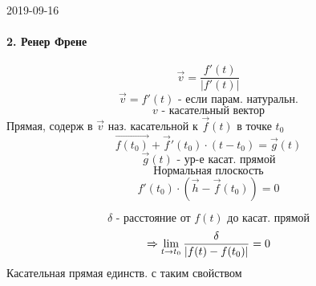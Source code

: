 \documentclass[12pt, fleqn]{article}
\begin{document}
\begin{lect} {2019-09-16}
\paragraph{2. Ренер Френе}
	\begin{Definition}
		\[\vec{v} = \frac{f'(t)}{|f'(t)|}\]
		\[\vec{v} = f'(t) \text{ - если парам. натуральн.}\]
		\[v \text{ - касательный вектор}\]
		Прямая, содерж в $\vec{v}$ наз. касательной к $\vec{f}(t)$ в точке $t_0$
		\[\vec{f(t_0)} + \vec{f}'(t_0) \cdot (t - t_0) = \vec{g}(t)\]
		\[\vec{g}(t) \text{ - ур-е касат. прямой}\]
		\[\text{Нормальная плоскость}\]
		\[f'(t_0) \cdot (\vec{h} - \vec{f}(t_0)) = 0\]
	\end{Definition}

	\begin{Theorem}
		\[\delta \text{ - расстояние от }f(t) \text{ до касат. прямой}\]
		\[\Rightarrow \lim_{t \to t_0} \frac{\delta}{|f(t) - f(t_0)|} = 0 \]
		Касательная прямая единств. с таким свойством
	\end{Theorem}

	\begin{Proof}
			
	\end{Proof}
\end{lect}
\end{document}
